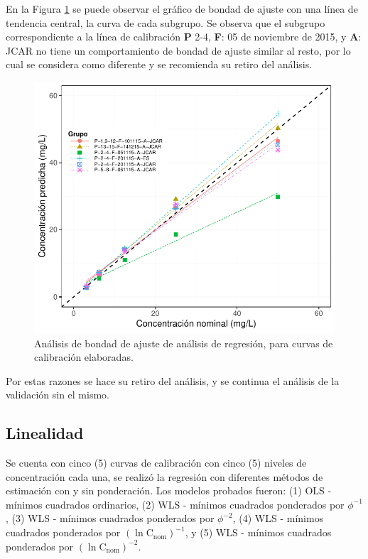 \documentclass{article}
\begin{document}
\noindent
En la Figura \ref{Fig:2} se puede observar el gráfico de bondad de ajuste con una línea de tendencia central, la curva de cada subgrupo. Se observa que el subgrupo correspondiente a la línea de calibración \textbf{P} 2-4, \textbf{F}: 05 de noviembre de 2015, y \textbf{A}: JCAR no tiene un comportamiento de bondad de ajuste similar al resto, por lo cual se considera como diferente y se recomienda su retiro del análisis. \\

\begin{figure}[h]
	\centering
	\includegraphics[width=0.8\linewidth]{Figuras/03_Comparacion_CC_1.pdf}
	\caption[Se muestran que una de los subgrupos muestra una desviación importante frente al resto de curvas]{Análisis de bondad de ajuste de análisis de regresión, para curvas de calibración elaboradas.}
	\label{Fig:2}
\end{figure}

Por estas razones se hace su retiro del análisis, y se continua el análisis de la validación sin el mismo. \\

\subsection{Linealidad}
Se cuenta con cinco (5) curvas de calibración con cinco (5) niveles de concentración cada una, se realizó la regresión con diferentes métodos de estimación con y sin ponderación. Los modelos probados fueron: (1) OLS - mínimos cuadrados ordinarios, (2) WLS - mínimos cuadrados ponderados por $\phi^{-1}$, (3) WLS - mínimos cuadrados ponderados por $\phi^{-2}$, (4) WLS - mínimos cuadrados ponderados por $\left(\ln{\mathrm{C_{nom}}}\right)^{-1}$, y (5) WLS - mínimos cuadrados ponderados por $\left(\ln{\mathrm{C_{nom}}}\right)^{-2}$.\\
\end{document}
